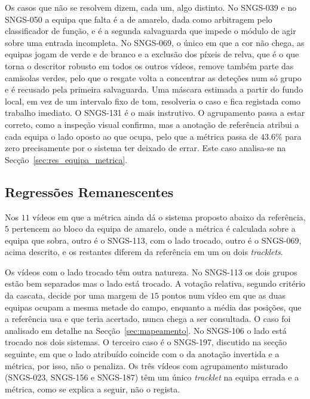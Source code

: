 Os casos que não se resolvem dizem, cada um, algo distinto. No SNGS-039 e no SNGS-050 a equipa que falta é a de amarelo, dada como arbitragem pelo classificador de função, e é a segunda salvaguarda que impede o módulo de agir sobre uma entrada incompleta. No SNGS-069, o único em que a cor não chega, as equipas jogam de verde e de branco e a exclusão dos píxeis de relva, que é o que torna o descritor robusto em todos os outros vídeos, remove também parte das camisolas verdes, pelo que o resgate volta a concentrar as deteções num só grupo e é recusado pela primeira salvaguarda. Uma máscara estimada a partir do fundo local, em vez de um intervalo fixo de tom, resolveria o caso e fica registada como trabalho imediato. O SNGS-131 é o mais instrutivo. O agrupamento passa a estar correto, como a inspeção visual confirma, mas a anotação de referência atribui a cada equipa o lado oposto ao que ocupa, pelo que a métrica passa de $43.6\%$ para zero precisamente por o sistema ter deixado de errar. Este caso analisa-se na Secção~\ref{sec:res_equipa_metrica}.

\subsection{Regressões Remanescentes}\label{sec:res_equipa_regressoes}

Nos $11$ vídeos em que a métrica ainda dá o sistema proposto abaixo da referência, $5$ pertencem ao bloco da equipa de amarelo, onde a métrica é calculada sobre a equipa que sobra, outro é o SNGS-113, com o lado trocado, outro é o SNGS-069, acima descrito, e os restantes diferem da referência em um ou dois \emph{tracklets}.

Os vídeos com o lado trocado têm outra natureza. No SNGS-113 os dois grupos estão bem separados mas o lado está trocado. A votação relativa, segundo critério da cascata, decide por uma margem de $15$ pontos num vídeo em que as duas equipas ocupam a mesma metade do campo, enquanto a média das posições, que a referência usa e que teria acertado, nunca chega a ser consultada. O caso foi analisado em detalhe na Secção~\ref{sec:mapeamento}. No SNGS-106 o lado está trocado nos dois sistemas. O terceiro caso é o SNGS-197, discutido na secção seguinte, em que o lado atribuído coincide com o da anotação invertida e a métrica, por isso, não o penaliza. Os três vídeos com agrupamento misturado (SNGS-023, SNGS-156 e SNGS-187) têm um único \emph{tracklet} na equipa errada e a métrica, como se explica a seguir, não o regista.

